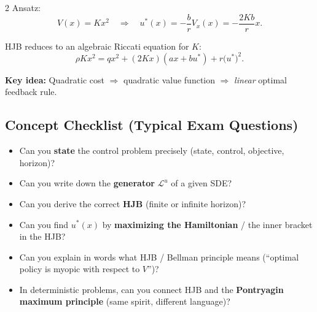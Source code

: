 \documentclass[12pt]{article}
\begin{document}
\begin{multicols}{2}
\noindent Ansatz:
\[
V(x) = K x^2
\quad\Rightarrow\quad
u^\ast(x) = -\frac{b}{r} V_x(x) = -\frac{2Kb}{r} x.
\]

\noindent HJB reduces to an algebraic Riccati equation for $K$:
\[
\rho K x^2
=
q x^2 +
(2Kx)(a x + b u^\ast)
+ r \bigl(u^\ast\bigr)^2.
\]

\noindent\textbf{Key idea:} Quadratic cost $\Rightarrow$ quadratic value function
$\Rightarrow$ \emph{linear} optimal feedback rule.

\subsection*{Concept Checklist (Typical Exam Questions)}

\begin{itemize}[noitemsep,leftmargin=*]
  \item Can you \textbf{state} the control problem precisely
        (state, control, objective, horizon)?
  \item Can you write down the \textbf{generator} $\mathcal{L}^u$ of a given SDE?
  \item Can you derive the correct \textbf{HJB} (finite or infinite horizon)?
  \item Can you find $u^\ast(x)$ by \textbf{maximizing the Hamiltonian} /
        the inner bracket in the HJB?
  \item Can you explain in words what HJB / Bellman principle means
        (``optimal policy is myopic with respect to $V$'')?
  \item In deterministic problems, can you connect HJB and the
        \textbf{Pontryagin maximum principle} (same spirit, different language)?
\end{itemize}

\end{multicols}

\restoregeometry
\endgroup
\end{document}
